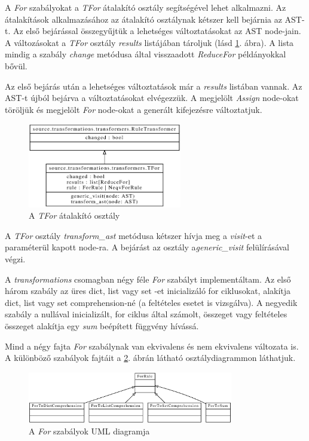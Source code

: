 A \emph{For} szabályokat a \emph{TFor} átalakító osztály segítségével lehet alkalmazni.
Az átalakítások alkalmazásához az átalakító osztálynak kétszer kell bejárnia az AST-t.
Az első bejárással összegyűjtük a lehetséges változtatásokat az AST node-jain.
A változásokat a \emph{TFor} osztály \emph{results} listájában tároljuk
(lásd \ref{fig:TFor}. ábra).
A lista mindig a szabály \emph{change} metódusa által visszaadott
\emph{ReduceFor} példányokkal bővül.

Az első bejárás után a lehetséges változtatások már a \emph{results} listában vannak.
Az AST-t újból bejárva a változtatásokat elvégezzük.
A megjelölt \emph{Assign} node-okat töröljük
és megjelölt \emph{For} node-okat a generált kifejezésre változtatjuk.

\begin{figure}[H]
	\centering
	\includegraphics[width=0.6\textwidth]{images/uml/TFor.eps}
	\caption{\label{fig:TFor}A \emph{TFor} átalakító osztály}
\end{figure}

A \emph{TFor} osztály \emph{transform\_ast} metódusa kétszer hívja
meg a \emph{visit}-et a paraméterül kapott node-ra.
A bejárást az osztály a\emph{generic\_visit} felülírásával végzi.

A \emph{transformations} csomagban négy féle \emph{For} szabályt implementáltam.
Az első három szabály az üres dict, list vagy set -et inicializáló for ciklusokat,
alakítja dict, list vagy set comprehension-né (a feltételes esetet is vizsgálva).
A negyedik szabály a nullával inicializált, for ciklus által számolt,
összeget vagy feltételes összeget alakítja egy \emph{sum} beépített függvény hívássá.

Mind a négy fajta \emph{For} szabálynak van ekvivalens és nem ekvivalens változata is.
A különböző szabályok fajtáit a \ref{fig:ForRules}. ábrán látható osztálydiagrammon láthatjuk.

\begin{figure}[H]
	\centering
	\includegraphics[width=0.8\textwidth]{images/uml/ForRules.eps}
	\caption{\label{fig:ForRules}A \emph{For} szabályok UML diagramja}
\end{figure}

